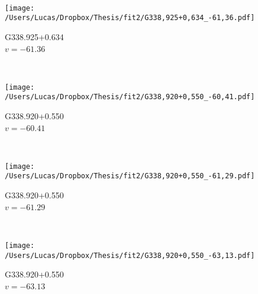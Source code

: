 \begin{figure*}[t]
\begin{subfigure}[t]{0.3\textwidth}
	\end{subfigure}
	~
	\begin{subfigure}[t]{0.3\textwidth}
		\texttt{[image: /Users/Lucas/Dropbox/Thesis/fit2/G338,925+0,634\_-61,36.pdf]}
		\caption[]{G338.925+0.634\\$v=-61.36$\,\kms}
	\end{subfigure}
	~
	\begin{subfigure}[t]{0.3\textwidth}
		\texttt{[image: /Users/Lucas/Dropbox/Thesis/fit2/G338,920+0,550\_-60,41.pdf]}
		\caption[]{G338.920+0.550\\$v=-60.41$\,\kms}
	\end{subfigure}
	~
	\begin{subfigure}[t]{0.3\textwidth}
		\texttt{[image: /Users/Lucas/Dropbox/Thesis/fit2/G338,920+0,550\_-61,29.pdf]}
		\caption[]{G338.920+0.550\\$v=-61.29$\,\kms}
	\end{subfigure}
	~
	\begin{subfigure}[t]{0.3\textwidth}
		\texttt{[image: /Users/Lucas/Dropbox/Thesis/fit2/G338,920+0,550\_-63,13.pdf]}
		\caption[]{G338.920+0.550\\$v=-63.13$\,\kms}
	\end{subfigure}
	~
\end{figure*}
\clearpage
